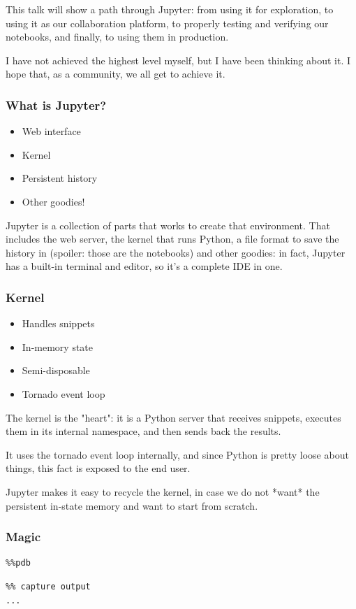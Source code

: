 This talk will show a path through Jupyter:
from using it for exploration,
to using it as our collaboration platform,
to properly testing and verifying our notebooks,
and finally, to using them in production.

I have not achieved the highest level myself,
but I have been thinking about it.
I hope that,
as a community,
we all get to achieve it.

\begin{frame}
\frametitle{What is Jupyter?}

\begin{itemize}
\item Web interface
\item Kernel
\item Persistent history
\item Other goodies!
\end{itemize}

\end{frame}

Jupyter is a collection of parts that works to create that environment.
That includes the web server,
the kernel that runs Python,
a file format to save the history in
(spoiler: those are the notebooks)
and other goodies:
in fact,
Jupyter has a built-in terminal and editor,
so it's a complete IDE in one.

\begin{frame}
\frametitle{Kernel}

\begin{itemize}
\item Handles snippets
\item In-memory state
\item Semi-disposable
\item Tornado event loop
\end{itemize}

\end{frame}

The kernel is the "heart":
it is a Python server
that receives snippets,
executes them in its internal namespace,
and then sends back the results.

It uses the tornado event loop internally,
and since Python is pretty loose about things,
this fact is exposed to the end user.

Jupyter makes it easy to recycle the kernel,
in case we do not *want* the persistent
in-state memory
and want to start from scratch.

\begin{frame}[fragile]
\frametitle{Magic}

\begin{lstlisting}
%%pdb
\end{lstlisting}

\begin{lstlisting}
%% capture output
...
\end{lstlisting}

\end{frame}

